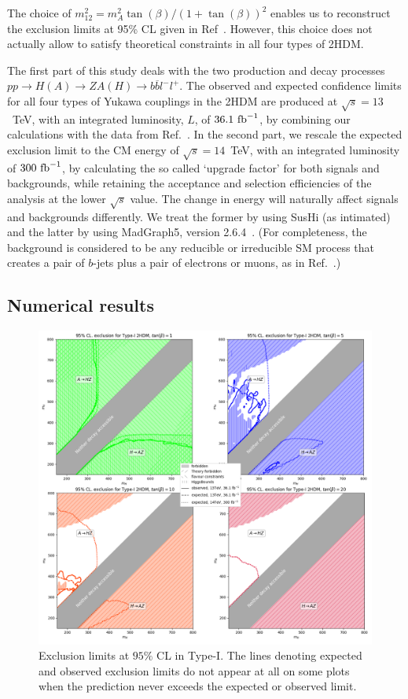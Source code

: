 The choice of \(m^2_{12} = m_A^2 \tan(\beta) / (1 + \tan(\beta))^2\) enables us to reconstruct the exclusion limits at 95\%  CL given in Ref~\cite{Aaboud:2018eoy}.
However, this choice does not actually allow to satisfy theoretical constraints in all four types of 2HDM.

The first part of this study deals with the two production and decay processes \(pp \rightarrow H(A) \rightarrow ZA(H)\rightarrow b\overline{b}l^{-}l^{+}\).
The observed and expected confidence limits for all four types of Yukawa couplings in the 2HDM are produced at \(\sqrt{s}=13\)~TeV, with an integrated luminosity, $L$, of \(36.1~{\rm fb}^{-1}\),
by combining our calculations with the data from Ref.~\cite{Aaboud:2018eoy}. 
In the second part, we rescale the expected exclusion limit to the CM energy of \(\sqrt{s}=14\)~TeV,
with an integrated luminosity of \(300~{\rm fb}^{-1}\), by calculating the so called `upgrade factor' for both signals and backgrounds, while retaining the acceptance and selection efficiencies of the analysis at the lower $\sqrt s$ value. The change in energy will naturally affect signals and backgrounds differently. We treat the former by using SusHi (as intimated) and the latter by  using {MadGraph5, version 2.6.4}~\cite{Alwall:2011uj}. (For completeness, the
 background is considered to be any reducible or irreducible SM process that creates a pair of $b$-jets plus a pair of electrons or muons, as in Ref.~\cite{Aaboud:2018eoy}.)

\subsection{Numerical results}


\begin{figure}[t!]
	\centering
    \includegraphics[width=\textwidth]{single_tbs/type1.png}
    \caption{Exclusion limits at \(95\%\) CL in Type-I.
             The lines denoting expected and observed exclusion limits
             do not appear at all on some plots when the prediction never exceeds the 
             expected or observed  limit.}\label{fig1}
\end{figure}

